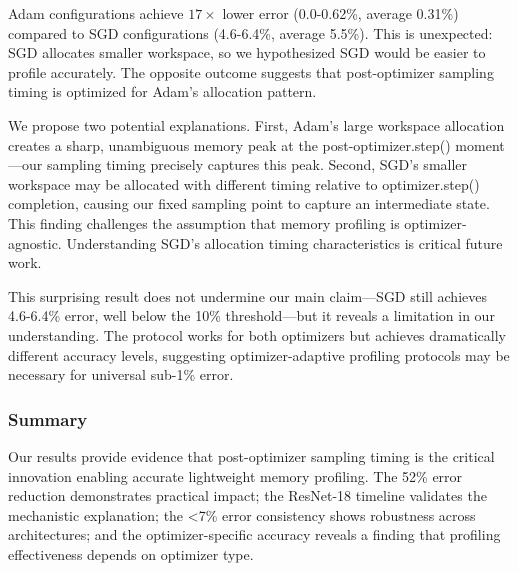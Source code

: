 Adam configurations achieve $17\times$ lower error (0.0-0.62\%, average 0.31\%) compared to SGD configurations (4.6-6.4\%, average 5.5\%). This is unexpected: SGD allocates smaller workspace, so we hypothesized SGD would be easier to profile accurately. The opposite outcome suggests that post-optimizer sampling timing is optimized for Adam's allocation pattern.

We propose two potential explanations. First, Adam's large workspace allocation creates a sharp, unambiguous memory peak at the post-optimizer.step() moment---our sampling timing precisely captures this peak. Second, SGD's smaller workspace may be allocated with different timing relative to optimizer.step() completion, causing our fixed sampling point to capture an intermediate state. This finding challenges the assumption that memory profiling is optimizer-agnostic. Understanding SGD's allocation timing characteristics is critical future work.

This surprising result does not undermine our main claim---SGD still achieves 4.6-6.4\% error, well below the 10\% threshold---but it reveals a limitation in our understanding. The protocol works for both optimizers but achieves dramatically different accuracy levels, suggesting optimizer-adaptive profiling protocols may be necessary for universal sub-1\% error.

\subsubsection{Summary}

Our results provide evidence that post-optimizer sampling timing is the critical innovation enabling accurate lightweight memory profiling. The 52\% error reduction demonstrates practical impact; the ResNet-18 timeline validates the mechanistic explanation; the <7\% error consistency shows robustness across architectures; and the optimizer-specific accuracy reveals a finding that profiling effectiveness depends on optimizer type.

